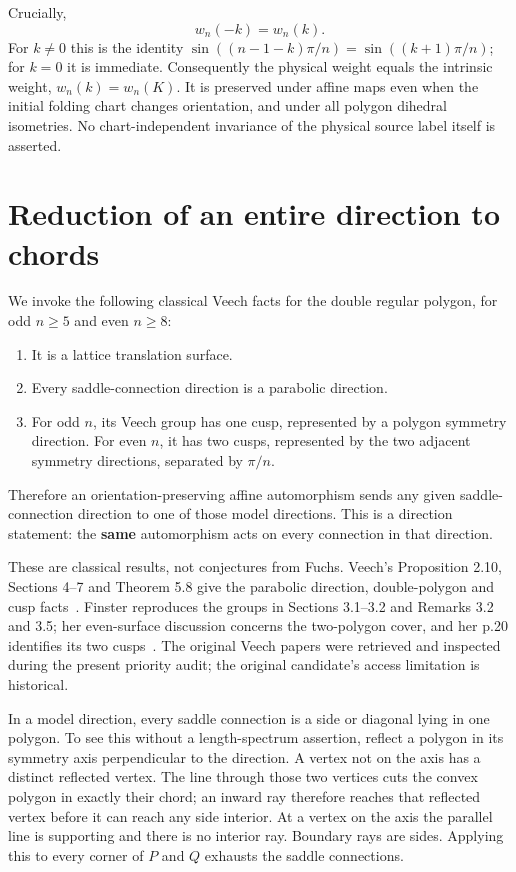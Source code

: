 \documentclass[11pt]{article}
\begin{document}
Crucially,
\[
w_n(-k)=w_n(k).
\tag{10}
\]
For \(k\ne0\) this is the identity
\(\sin((n-1-k)\pi/n)=\sin((k+1)\pi/n)\); for \(k=0\) it is immediate. Consequently the physical weight equals the intrinsic weight, \(w_n(k)=w_n(K)\). It is preserved under affine maps even when the initial folding chart changes orientation, and under all polygon dihedral isometries. No chart-independent invariance of the physical source label itself is asserted.

\section{Reduction of an entire direction to chords}

We invoke the following classical Veech facts for the double regular polygon, for odd \(n\ge5\) and even \(n\ge8\):

\begin{enumerate}
\item It is a lattice translation surface.
\item Every saddle-connection direction is a parabolic direction.
\item For odd \(n\), its Veech group has one cusp, represented by a polygon symmetry direction. For even \(n\), it has two cusps, represented by the two adjacent symmetry directions, separated by \(\pi/n\).

\end{enumerate}
Therefore an orientation-preserving affine automorphism sends any given saddle-connection direction to one of those model directions. This is a direction statement: the \textbf{same} automorphism acts on every connection in that direction.

These are classical results, not conjectures from Fuchs. Veech's Proposition 2.10, Sections 4--7 and Theorem 5.8 give the parabolic direction, double-polygon and cusp facts~\cite{Veech}. Finster reproduces the groups in Sections 3.1--3.2 and Remarks 3.2 and 3.5; her even-surface discussion concerns the two-polygon cover, and her p.20 identifies its two cusps~\cite{Finster}. The original Veech papers were retrieved and inspected during the present priority audit; the original candidate's access limitation is historical.

In a model direction, every saddle connection is a side or diagonal lying in one polygon. To see this without a length-spectrum assertion, reflect a polygon in its symmetry axis perpendicular to the direction. A vertex not on the axis has a distinct reflected vertex. The line through those two vertices cuts the convex polygon in exactly their chord; an inward ray therefore reaches that reflected vertex before it can reach any side interior. At a vertex on the axis the parallel line is supporting and there is no interior ray. Boundary rays are sides. Applying this to every corner of \(P\) and \(Q\) exhausts the saddle connections.
\end{document}
